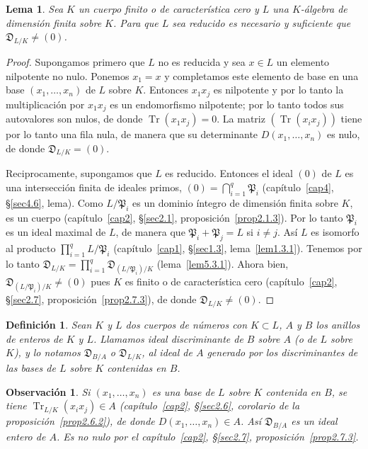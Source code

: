 \documentclass[10pt,oneside,bibtotoc,smallheadings,leqno,a5paper,DIV=12]{scrbook}
\newcommand{\idl}[1]{\mathfrak{#1}}
\newcommand{\QED}{}%
\newcommand{\disc}{\mathfrak{D}}
\DeclareMathOperator{\Tr}{Tr}
\numberwithin{equation}{section}
\theoremstyle{defi}
\newtheorem{definition}{Definici\'on}
\theoremstyle{enonce}
\newtheorem{lemma}{Lema}
\theoremstyle{rem}
\newtheorem{remark}{Observaci\'on}
\numberwithin{theorem}{section}
\numberwithin{proposition}{section}
\numberwithin{definition}{section}
\numberwithin{lemma}{section}
\numberwithin{corollary}{section}
\numberwithin{example}{section}
\numberwithin{footnote}{section}%
\begin{document}
\begin{lemma}\label{lem5.3.3}
Sea $K$ un cuerpo finito o de caracter\'istica cero y $L$ una $K$-\'algebra de dimensi\'on finita sobre $K$.
Para que $L$ sea reducido es necesario y suficiente que $\disc_{L/K}\neq(0)$.
\end{lemma}

\begin{proof}
Supongamos primero que $L$ no es reducida y sea $x\in L$ un elemento nilpotente no nulo. Ponemos $x_{1}=x$ y
completamos este elemento de base en una base $(x_{1},\dots,x_{n})$ de $L$ sobre $K$. Entonces $x_{1}x_{j}$
es nilpotente y por lo tanto la multiplicaci\'on por $x_{1}x_{j}$ es un endomorfismo nilpotente; por lo tanto
todos sus autovalores son nulos, de donde $\Tr(x_{1}x_{j}) = 0$. La matriz $(\Tr(x_{i}x_{j}))$ tiene por lo tanto
una fila nula, de manera que su determinante $D(x_{1},\dots,x_{n})$ es nulo, de donde $\disc_{L/K}=(0)$.

Reciprocamente, supongamos que $L$ es reducido. Entonces el ideal $(0)$ de $L$ es una intersecci\'on finita
de ideales primos, $(0) = \bigcap_{i=1}^{q}\idl{P}_{i}$ (cap\'itulo~\ref{cap4}, \S\ref{sec4.6}, lema).
Como $L/\idl{P}_{i}$ es un dominio \'integro de dimensi\'on finita sobre $K$, es un cuerpo (cap\'itulo~\ref{cap2},
\S\ref{sec2.1}, proposici\'on~\ref{prop2.1.3}).
Por lo tanto $\idl{P}_{i}$ es un ideal maximal de $L$, de manera que $\idl{P}_{i}+\idl{P}_{j}=L$
si $i\neq j$. As\'i $L$ es isomorfo al producto $\prod_{i=1}^{q}L/\idl{P}_{i}$ (cap\'itulo~\ref{cap1}, \S\ref{sec1.3}, lema~\ref{lem1.3.1}).
Tenemos por lo tanto $\disc_{L/K}=\prod_{i=1}^{q}\disc_{(L/\idl{P}_{i})/K}$
(lema~\ref{lem5.3.1}). Ahora bien,
$\disc_{(L/\idl{P}_{i})/K}\neq(0)$ pues $K$ es finito o de caracter\'istica cero
(cap\'itulo~\ref{cap2}, \S\ref{sec2.7}, proposici\'on~\ref{prop2.7.3}), de donde $\disc_{L/K}\neq(0)$. \QED
\end{proof}

\begin{definition}\label{defV.3.1}
Sean $K$ y $L$ dos cuerpos de n\'umeros con $K\subset L$, $A$ y $B$ los anillos de enteros de $K$ y $L$.
Llamamos ideal discriminante de $B$ sobre $A$ (o de $L$ sobre $K$), y lo notamos $\disc_{B/A}$ o $\disc_{L/K}$,
al ideal de $A$ generado por los discriminantes de las bases de $L$ sobre $K$ contenidas en $B$.
\end{definition}

\begin{remark}
Si $(x_{1},\dots,x_{n})$ es una base de $L$ sobre $K$ contenida en $B$,
se tiene $\Tr_{L/K}(x_{i}x_{j})\in A$ (cap\'itulo~\ref{cap2}, \S\ref{sec2.6}, corolario de la proposici\'on~\ref{prop2.6.2}), de donde
$D(x_{1},\dots,x_{n})\in A$. As\'i $\disc_{B/A}$ es un ideal {\em entero} de $A$. Es {\em no nulo} por
el cap\'itulo~\ref{cap2}, \S\ref{sec2.7}, proposici\'on~\ref{prop2.7.3}.
\end{remark}
\end{document}
